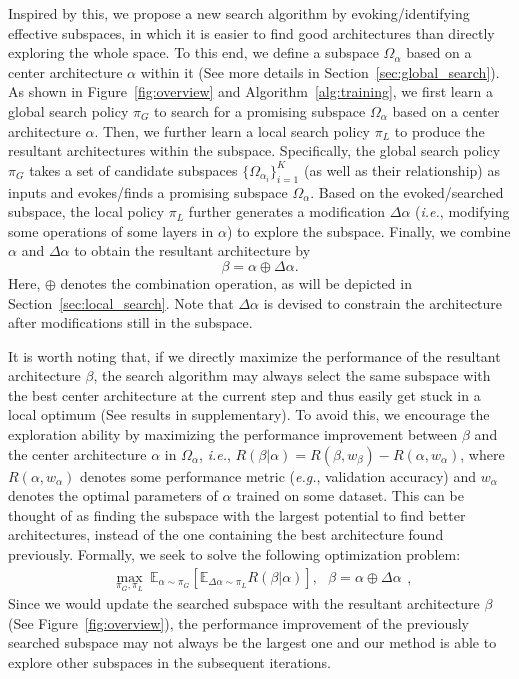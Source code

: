 \documentclass[lettersize,journal]{IEEEtran}
\def\mmE{{\mathbb E}}
\def\eg{\emph{e.g.}} \def\Eg{\emph{E.g.}}
\def\ie{\emph{i.e.}} \def\Ie{\emph{I.e.}}
\begin{document}
Inspired by this, we propose a new search algorithm by evoking/identifying effective subspaces, in which 
it is easier to find good architectures than directly exploring the whole space.
To this end, we define a subspace $\Omega_\alpha$ based on a center architecture $\alpha$ within it (See more details in Section~\ref{sec:global_search}).
As shown in Figure~\ref{fig:overview} and Algorithm~\ref{alg:training}, we first learn a global search policy $\pi_G$ to search for a promising subspace $\Omega_\alpha$ based on a center architecture $\alpha$.
Then, we further learn a local search policy $\pi_L$ to produce the resultant architectures within the subspace.
Specifically, the global search policy $\pi_G$ takes a set of candidate subspaces $\{\Omega_{\alpha_i}\}_{i=1}^{K}$ (as well as their relationship) as inputs and evokes/finds a promising subspace $\Omega_{\alpha}$.
Based on the evoked/searched subspace, the local policy $\pi_L$ further generates a modification $\Delta\alpha$ (\ie, modifying some operations of some layers in $\alpha$) to explore the subspace.
Finally, we combine $\alpha$ and $\Delta \alpha$ to obtain the resultant architecture by
\begin{equation}
    \beta {=} \alpha {\oplus} \Delta \alpha.
\end{equation}
Here, $\oplus$ denotes the combination operation, as will be depicted in Section~\ref{sec:local_search}.
Note that $\Delta \alpha$ is devised to constrain the architecture after modifications still in the subspace.

It is worth noting that, if we directly maximize the performance of the resultant architecture $\beta$, the search algorithm may always select the same subspace with the best center architecture at the current step and thus easily get stuck in a local optimum (See results in supplementary). To avoid this, we encourage the exploration ability by maximizing the performance improvement between $\beta$ and the center architecture $\alpha$ in $\Omega_{\alpha}$, \ie, $R(\beta|\alpha) {=} R(\beta,w_{\beta}) {-} R(\alpha,w_{\alpha})$,
where $R(\alpha, w_{\alpha})$ denotes some performance metric (\eg, validation accuracy) and $w_{\alpha}$ denotes the optimal parameters of $\alpha$ trained on some dataset.
This can be thought of as finding the subspace with the largest potential to find better architectures, instead of the one containing the best architecture found previously.
Formally, we seek to solve the following optimization problem:
\begin{equation}\label{eq:multiple_anchor_objective}
	\begin{aligned}
	\max_{\pi_{G},\pi_{L}}~\mmE_{\alpha \sim \pi_{G}} \left[\mmE_{\Delta \alpha \sim \pi_{L}}  R(\beta|\alpha) \right], ~~~\beta=\alpha {\oplus} \Delta \alpha
	\end{aligned},
\end{equation}
Since we would update the searched subspace with the resultant architecture $\beta$ (See Figure~\ref{fig:overview}), the performance improvement of the previously searched subspace may not always be the largest one and our method is able to explore other subspaces in the subsequent iterations.
\end{document}
